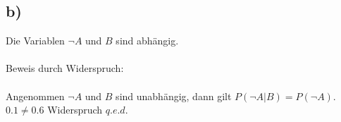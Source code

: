 \subsection{b)}
Die Variablen $\neg A$ und $B$ sind abhängig.\\
\\
Beweis durch Widerspruch:\\
\\
Angenommen $\neg A$ und $B$ sind unabhängig, dann gilt $P(\neg A|B) = P(\neg A)$.
\\
$0.1 \neq 0.6$ Widerspruch $q.e.d.$


